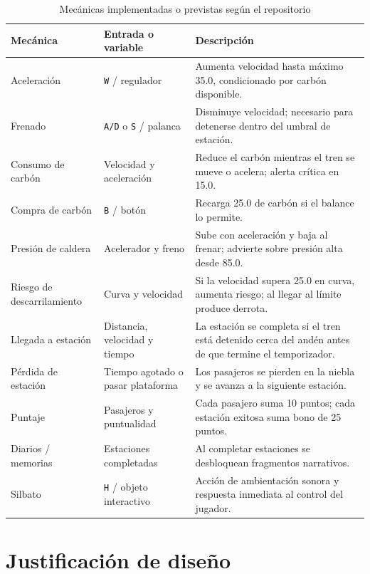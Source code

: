 \documentclass[12pt,letterpaper]{article}
\begin{document}
\begin{table}[H]
\centering
\caption{Mecánicas implementadas o previstas según el repositorio}
\small
\begin{tabularx}{\textwidth}{L{4cm}L{3.5cm}Y}
\toprule
\textbf{Mecánica} & \textbf{Entrada o variable} & \textbf{Descripción} \\
\midrule
Aceleración & \texttt{W} / regulador & Aumenta velocidad hasta máximo 35.0, condicionado por carbón disponible. \\
Frenado & \texttt{A/D} o \texttt{S} / palanca & Disminuye velocidad; necesario para detenerse dentro del umbral de estación. \\
Consumo de carbón & Velocidad y aceleración & Reduce el carbón mientras el tren se mueve o acelera; alerta crítica en 15.0. \\
Compra de carbón & \texttt{B} / botón & Recarga 25.0 de carbón si el balance lo permite. \\
Presión de caldera & Acelerador y freno & Sube con aceleración y baja al frenar; advierte sobre presión alta desde 85.0. \\
Riesgo de descarrilamiento & Curva y velocidad & Si la velocidad supera 25.0 en curva, aumenta riesgo; al llegar al límite produce derrota. \\
Llegada a estación & Distancia, velocidad y tiempo & La estación se completa si el tren está detenido cerca del andén antes de que termine el temporizador. \\
Pérdida de estación & Tiempo agotado o pasar plataforma & Los pasajeros se pierden en la niebla y se avanza a la siguiente estación. \\
Puntaje & Pasajeros y puntualidad & Cada pasajero suma 10 puntos; cada estación exitosa suma bono de 25 puntos. \\
Diarios / memorias & Estaciones completadas & Al completar estaciones se desbloquean fragmentos narrativos. \\
Silbato & \texttt{H} / objeto interactivo & Acción de ambientación sonora y respuesta inmediata al control del jugador. \\
\bottomrule
\end{tabularx}
\end{table}

\section{Justificación de diseño}
\end{document}
